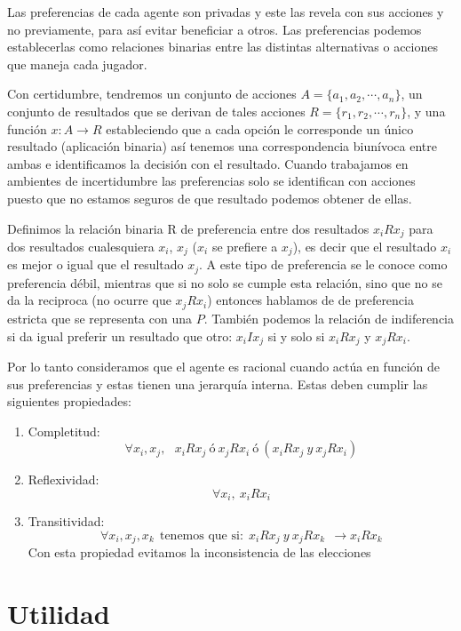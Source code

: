 \documentclass[12pt,a4paper,]{book}
\providecommand{\tightlist}{%
  \setlength{\itemsep}{0pt}\setlength{\parskip}{0pt}}
\numberwithin{dummy}{section}
\theoremstyle{ocrenumbox}
\theoremstyle{blacknumex}
\theoremstyle{blacknumbox}
\theoremstyle{ocrenum}
\theoremstyle{ocrenum}
\begin{document}
Las preferencias de cada agente son privadas y este las revela con sus
acciones y no previamente, para así evitar beneficiar a otros. Las
preferencias podemos establecerlas como relaciones binarias entre las
distintas alternativas o acciones que maneja cada jugador.

Con certidumbre, tendremos un conjunto de acciones
\(A=\{a_1, a_2,\cdots,a_n\}\), un conjunto de resultados que se derivan
de tales acciones \(R=\{r_1,r_2,\cdots,r_n\}\), y una función
\(x: A \rightarrow R\) estableciendo que a cada opción le corresponde un
único resultado (aplicación binaria) así tenemos una correspondencia
biunívoca entre ambas e identificamos la decisión con el resultado.
Cuando trabajamos en ambientes de incertidumbre las preferencias solo se
identifican con acciones puesto que no estamos seguros de que resultado
podemos obtener de ellas.

Definimos la relación binaria R de preferencia entre dos resultados
\(x_iRx_j\) para dos resultados cualesquiera \(x_i\), \(x_j\) (\(x_i\)
se prefiere a \(x_j\)), es decir que el resultado \(x_i\) es mejor o
igual que el resultado \(x_j\). A este tipo de preferencia se le conoce
como preferencia débil, mientras que si no solo se cumple esta relación,
sino que no se da la reciproca (no ocurre que \(x_jRx_i\)) entonces
hablamos de de preferencia estricta que se representa con una \(P\).
También podemos la relación de indiferencia si da igual preferir un
resultado que otro: \(x_iIx_j\) si y solo si \(x_iRx_j\) y \(x_jRx_i\).

Por lo tanto consideramos que el agente es racional cuando actúa en
función de sus preferencias y estas tienen una jerarquía interna. Estas
deben cumplir las siguientes propiedades:

\begin{enumerate}
\def\labelenumi{\arabic{enumi}.}
\tightlist
\item
  Completitud: \[
  \forall x_i,x_j, \ \ \ x_iRx_j \ ó \ x_jRx_i \ ó \ (x_iRx_j \ y \ x_jRx_i )
  \]
\item
  Reflexividad: \[
  \forall x_i, \ x_iRx_i
  \]
\item
  Transitividad: \[
  \forall x_i,x_j,x_k \ \ \text{tenemos que si:} \ \ x_iRx_j \ y \ x_jRx_k \ \ \rightarrow x_iRx_k
  \] Con esta propiedad evitamos la inconsistencia de las elecciones
\end{enumerate}

\hypertarget{Seccion13}{%
\section{Utilidad}\label{Seccion13}}
\end{document}
